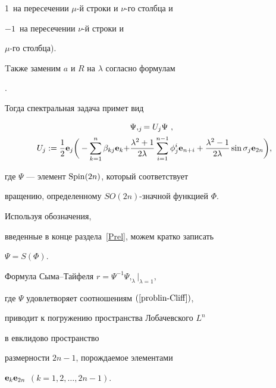 1~на пересечении $\mu$-й строки и $\nu$-го столбца и 


$-1$~на пересечении $\nu$-й строки и 


$\mu$-го столбца).


Tакже заменим $a$ и $R$ на $\lambda$ согласно формулам


.


Тогда спектральная задача  примет вид


\begin{equation}


\label{problin-Cliff} 


\begin{split}


&\Psi,_j = U_j \Psi \ , \\


%


U_j := \frac{1}{2} \e_j \bigg( - \sum_{k=1}^{n} \beta_{kj} \e_k +


&\frac{\lambda^2+1}{2\lambda} \sum_{i=1}^{n-1} \phi_j^i \e_{n+i} + 


\frac{\lambda^2-1}{2\lambda} \sin\sigma_j \e_{2n} 


\bigg),


\end{split}


\end{equation}


где $\Psi$ --- элемент $\operatorname{Spin}(2n)$, который соответствует


вращению, определенному $SO(2n)$-значной функцией $\Phi$.


Используя обозначения,


введенные в конце раздела~\ref{Prel}, можем кратко записать


$ \Psi = S (\Phi)$.





\begin{thm}


\label{Cispace}


Формула Сыма--Тайфеля $r = \Psi^{-1} \Psi,_\lambda|_{\lambda=1}$,


где $\Psi$ удовлетворяет соотношениям $\rf{problin-Cliff}$,


приводит к погружению пространства Лобачевского $L^n$


в евклидово пространство


размерности $2n-1$, порождаемое элементами


$\bold e_k \bold e_{2n}$ $(k=1,2,\dotsc,2n-1)$.


\end{thm}





